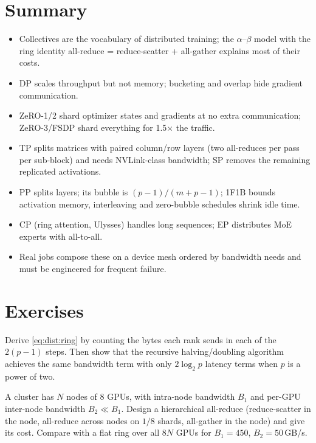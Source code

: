\section{Summary}\label{sec:dist:summary}
\begin{itemize}
\item Collectives are the vocabulary of distributed training; the $\alpha$--$\beta$ model with the
  ring identity all-reduce = reduce-scatter + all-gather explains most of their costs.
\item DP scales throughput but not memory; bucketing and overlap hide gradient communication.
\item ZeRO-1/2 shard optimizer states and gradients at no extra communication; ZeRO-3/FSDP shard
  everything for 1.5$\times$ the traffic.
\item TP splits matrices with paired column/row layers (two all-reduces per pass per sub-block)
  and needs NVLink-class bandwidth; SP removes the remaining replicated activations.
\item PP splits layers; its bubble is $(p-1)/(m+p-1)$; 1F1B bounds activation memory, interleaving
  and zero-bubble schedules shrink idle time.
\item CP (ring attention, Ulysses) handles long sequences; EP distributes MoE experts with
  all-to-all.
\item Real jobs compose these on a device mesh ordered by bandwidth needs and must be engineered
  for frequent failure.
\end{itemize}

\section{Exercises}\label{sec:dist:exercises}

\begin{exercise}
Derive \cref{eq:dist:ring} by counting the bytes each rank sends in each of the $2(p-1)$ steps.
Then show that the recursive halving/doubling algorithm achieves the same bandwidth term with
only $2\log_2p$ latency terms when $p$ is a power of two.
\end{exercise}

\begin{exercise}
A cluster has $N$ nodes of 8 GPUs, with intra-node bandwidth $B_1$ and per-GPU inter-node
bandwidth $B_2\ll B_1$. Design a hierarchical all-reduce (reduce-scatter in the node, all-reduce
across nodes on $1/8$ shards, all-gather in the node) and give its cost. Compare with a flat ring
over all $8N$ GPUs for $B_1=450$, $B_2=50$\,GB/s.
\end{exercise}

